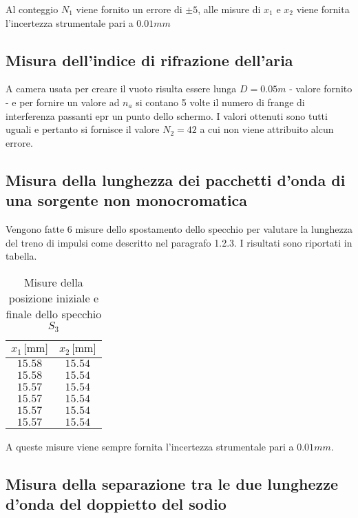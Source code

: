 \documentclass[]{article}
\let\oldsubsection\subsection%
\renewcommand{\subsection}{%
	\renewcommand{\theequation}{\thesubsection.\arabic{equation}}%
	\oldsubsection}%
\begin{document}
Al conteggio $N_1$ viene fornito un errore di $ \pm 5$, alle misure di $x_1$ e $x_2$ viene fornita l'incertezza strumentale pari a $0.01 mm$ 


\subsection{Misura dell'indice di rifrazione dell'aria}

A camera usata per creare il vuoto risulta essere lunga $D=0.05 m$ - valore fornito - e per fornire un valore ad $n_a$ si contano 5 volte il numero di frange di interferenza passanti epr un punto dello schermo. I valori ottenuti sono tutti uguali e pertanto si fornisce il valore $N_2 = 42$ a cui non viene attribuito alcun errore.

\subsection{Misura della lunghezza dei pacchetti d'onda di una sorgente non monocromatica}

Vengono fatte 6 misure dello spostamento dello specchio per valutare la lunghezza del treno di impulsi come descritto nel paragrafo 1.2.3. I risultati sono riportati in tabella.

\begin{table}[H]
    \centering

    \begin{tabular}{||c|c||}
        \hline
        $x_1 \, \text{[mm]}$ & $x_2\, \text{[mm]}$ \\
        \hline\hline

        $15.58$ & $15.54$ \\\hline
        $15.58$ & $15.54$ \\\hline
        $15.57$ & $15.54$ \\\hline
        $15.57$ & $15.54$ \\\hline
        $15.57$ & $15.54$ \\\hline
        $15.57$ & $15.54$ \\\hline
    
    \end{tabular}
    \caption{Misure della posizione iniziale e finale dello specchio $S_3$}
    \label{L}    
\end{table}

A queste misure viene sempre fornita l'incertezza strumentale pari a $0.01mm$.

\subsection{Misura della separazione tra le due lunghezze d'onda del doppietto del sodio}
\end{document}
